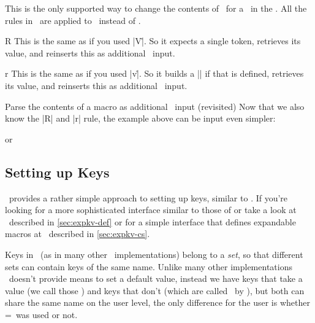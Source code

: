 \begin{function}[module=Expansion]{\key}
  \begin{syntax}
  \end{syntax}
  This is the only supported way to change the contents of \key\ for a \Vkey\ in
  the \expnotation. All the rules in \expansion\ are applied to \key\ instead of
  \val.
\end{function}

\begin{function}[module=Expansion]{R}
  This is the same as if you used |V\r|. So it expects a single token, retrieves
  its value, and reinserts this as additional \kv\ input.
\end{function}

\begin{function}[module=Expansion]{r}
  This is the same as if you used |v\r|. So it builds a |\csname| if that is
  defined, retrieves its value, and reinserts this as additional \kv\ input.
\end{function}
\begin{example}
  {Parse the contents of a macro as additional \kv\ input (revisited)}
  Now that we also know the |R| and |r| rule, the example above can be input
  even simpler:
  \begin{enverb}[no-tcb]
  \end{enverb}
  or
  \begin{enverb}[no-tcb]
  \end{enverb}
\end{example}
\endgroup

\subsection{Setting up Keys\label{sec:expkv:setup}}

\expkv\ provides a rather simple approach to setting up keys, similar to
. If you're looking for a more sophisticated interface similar to
those of  or  take a look at \expkvd\ described in
\autoref{sec:expkv-def} or for a simple interface that defines expandable macros
at \expkvc\ described in \autoref{sec:expkv-cs}.

Keys in \expkv\ (as in many other \kv\ implementations) belong to a \emph{set},
so that different sets can contain keys of the same name. Unlike many other
implementations \expkv\ doesn't provide means to set a default value, instead we
have keys that take a value (we call those \Vkey) and keys that don't (which are
called \Nkey\ by \expkv), but both can share the same name on the user level,
the only difference for the user is whether =\val\ was used or not.

